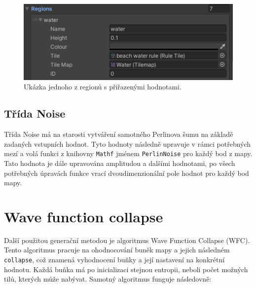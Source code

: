 \begin{figure}[H]
	\centering
	\includegraphics[scale=1]{obrazky-figures/MapGeneratorRegions.png}
	\caption{Ukázka jednoho z regionů s přiřazenými hodnotami.}
	\label{fig:MapGeneratorRegions}
\end{figure}
 
\subsection{Třída Noise}
\label{noiseClass}
Třída Noise má na starosti vytváření samotného Perlinova šumu na základě zadaných vstupních hodnot. Tyto hodnoty následně upravuje v rámci potřebných mezí a volá funkci z knihovny \texttt{Mathf} jménem \texttt{PerlinNoise} pro každý bod z mapy. Tato hodnota je dále upravována amplitudou a dalšími hodnotami, po všech potřebných úpravách funkce vrací dvoudimenzionální pole hodnot pro každý bod mapy.

\section{Wave function collapse}
\label{WFCImplement}
Další použitou generační metodou je algoritmus Wave Function Collapse (WFC). Tento algoritmus pracuje na ohodnocování buněk mapy a jejich následném \texttt{collapse}, což znamená vyhodnocení buňky a její nastavení na konkrétní hodnotu. Každá buňka má po inicializaci stejnou entropii, neboli počet možných tilů, kterých může nabývat. Samotný algoritmus funguje následovně:

